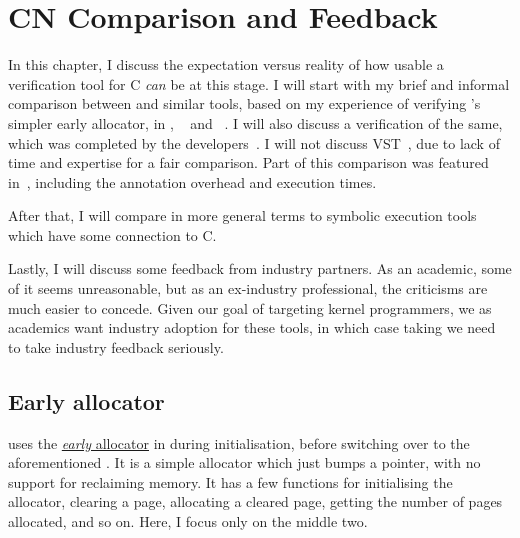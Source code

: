 \chapter{CN Comparison and Feedback}\label{chap:comparison-feedback}

\margintoc{}

In this chapter, I discuss the expectation versus reality of how usable a
verification tool for C \emph{can} be at this stage. I will start with my brief
and informal comparison between  and similar tools, based on my
experience of verifying 's simpler early allocator, in ,
~\cite{jacobs2011verifast} and
~\cite{pascal2012frama}. I will also discuss a 
verification of the same, which was completed by the
developers~\cite{sammler2021refinedc}. I will not discuss
VST~\cite{appel2011verified}, due to lack of time and expertise for a fair
comparison. Part of this comparison was featured in~\textcite{pulte2023cn},
including the annotation overhead and execution times.

After that, I will compare  in more general terms to symbolic
execution tools which have some connection to C.

Lastly, I will discuss some feedback from industry partners. As an academic,
some of it seems unreasonable, but as an ex-industry professional, the
criticisms are much easier to concede. Given our goal of targeting kernel
programmers, we as academics want industry adoption for these tools, in which
case taking we need to take industry feedback seriously.%
%
%
%
%
%

\section{Early allocator}

 uses the 
\href{https://github.com/rems-project/CN-pKVM-early-allocator-case-study}{{\emph{early}
allocator}} in  during initialisation, before switching over to the
aforementioned . It is a simple allocator which just bumps
a pointer, with no support for reclaiming memory. It has a few functions for
initialising the allocator, clearing a page, allocating a cleared page,
getting the number of pages allocated, and so on. Here, I focus only on
the middle two.

